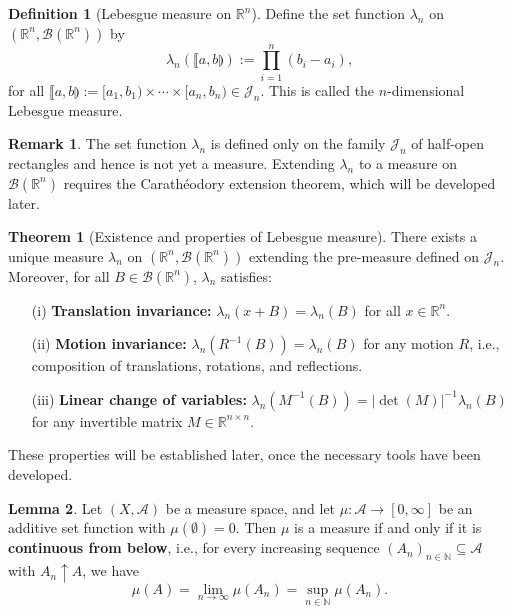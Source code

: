 \documentclass{article}
\theoremstyle{definition}
\newtheorem{definition}{Definition}[section]
\newtheorem{theorem}{Theorem}[section]
\newtheorem{lemma}[theorem]{Lemma}
\newtheorem{remark}{Remark}[section]
\begin{document}
\medskip
\begin{definition}[Lebesgue measure on \(\mathbb{R}^n\)]
Define the set function \(\lambda_n\) on \((\mathbb{R}^n, \mathcal{B}(\mathbb{R}^n))\) by
\[
\lambda_n\left( \llbracket a, b \rrparenthesis \right) := \prod_{i=1}^n (b_i - a_i),
\]
for all \(\llbracket a, b \rrparenthesis := [a_1, b_1) \times \cdots \times [a_n, b_n) \in \mathcal{J}_n\).  
This is called the \(n\)-dimensional Lebesgue measure.
\end{definition}

\begin{remark}
The set function \(\lambda_n\) is defined only on the family \(\mathcal{J}_n\) of half-open rectangles and hence is not yet a measure. Extending \(\lambda_n\) to a measure on \(\mathcal{B}(\mathbb{R}^n)\) requires the Carathéodory extension theorem, which will be developed later.
\end{remark}


\medskip
\begin{theorem}[Existence and properties of Lebesgue measure]
There exists a unique measure \(\lambda_n\) on \((\mathbb{R}^n, \mathcal{B}(\mathbb{R}^n))\) extending the pre-measure defined on \(\mathcal{J}_n\). Moreover, for all \(B \in \mathcal{B}(\mathbb{R}^n)\), \(\lambda_n\) satisfies:
\begin{itemize}
    \item[(i)] \textbf{Translation invariance:} \(\lambda_n(x + B) = \lambda_n(B)\) for all \(x \in \mathbb{R}^n\).
    \item[(ii)] \textbf{Motion invariance:} \(\lambda_n(R^{-1}(B)) = \lambda_n(B)\) for any motion \(R\), i.e., composition of translations, rotations, and reflections.
    \item[(iii)] \textbf{Linear change of variables:} \(\lambda_n(M^{-1}(B)) = |\det(M)|^{-1} \lambda_n(B)\) for any invertible matrix \(M \in \mathbb{R}^{n \times n}\).
\end{itemize}
These properties will be established later, once the necessary tools have been developed.
\end{theorem}


\medskip
\begin{lemma}
Let \((X, \mathcal{A})\) be a measure space, and let \(\mu : \mathcal{A} \to [0, \infty]\) be an additive set function with \(\mu(\emptyset) = 0\). Then \(\mu\) is a measure if and only if it is \textbf{continuous from below}, i.e., for every increasing sequence \((A_n)_{n \in \mathbb{N}} \subseteq \mathcal{A}\) with \(A_n \uparrow A\), we have
\[
\mu(A) = \lim_{n \to \infty} \mu(A_n) = \sup_{n \in \mathbb{N}} \mu(A_n).
\]
\end{lemma}
\end{document}

